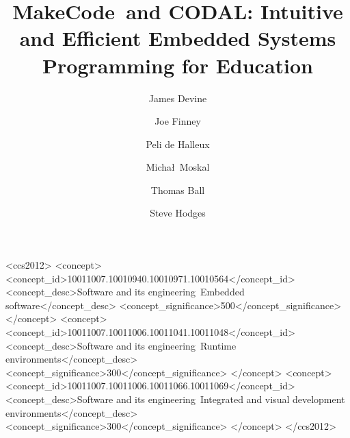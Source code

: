 \documentclass[sigplan, screen]{acmart}
\newcommand{\MC}{MakeCode\ }
\newcommand{\CON}{CODAL}
\begin{document}
\title[Embedded Systems Programming for Education]{\MC and \CON: Intuitive and Efficient Embedded Systems Programming for Education}         %

\acmPrice{}


\author{James Devine}

\author{Joe Finney}

\author{Peli de Halleux}

\author{Micha\l\ Moskal}

\author{Thomas Ball}

\author{Steve Hodges}



\begin{CCSXML}
  <ccs2012>
  <concept>
  <concept_id>10011007.10010940.10010971.10010564</concept_id>
  <concept_desc>Software and its engineering~Embedded software</concept_desc>
  <concept_significance>500</concept_significance>
  </concept>
  <concept>
  <concept_id>10011007.10011006.10011041.10011048</concept_id>
  <concept_desc>Software and its engineering~Runtime environments</concept_desc>
  <concept_significance>300</concept_significance>
  </concept>
  <concept>
  <concept_id>10011007.10011006.10011066.10011069</concept_id>
  <concept_desc>Software and its engineering~Integrated and visual development environments</concept_desc>
  <concept_significance>300</concept_significance>
  </concept>
  </ccs2012>
\end{CCSXML}
\end{document}
